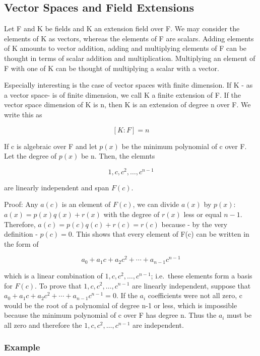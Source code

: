 \subsection{Vector Spaces and Field
Extensions}\label{vector-spaces-and-field-extensions}

Let F and K be fields and K an extension field over F. We may consider
the elements of K as vectors, whereas the elements of F are scalars.
Adding elements of K amounts to vector addition, adding and multiplying
elements of F can be thought in terms of scalar addition and
multiplication. Multiplying an element of F with one of K can be thought
of multiplying a scalar with a vector.

Especially interesting is the case of vector spaces with finite
dimension. If K - as a vector space- is of finite dimension, we call K a
finite extension of F. If the vector space dimension of K is n, then K
is an extension of degree n over F. We write this as

\[
[K:F] = n
\]

If c is algebraic over F and let \(p(x)\) be the minimum polynomial of c
over F. Let the degree of \(p(x)\) be n. Then, the elemnts

\[
1, c, c^2, \ldots, c^{n-1}
\]

are linearly independent and span \(F(c)\).

Proof: Any \(a(c)\) is an element of \(F(c)\), we can divide \(a(x)\) by
\(p(x)\): \(a(x) = p(x) q(x) + r(x)\) with the degree of \(r(x)\) less
or equal \(n-1\). Therefore, \(a(c) = p(c) q(c) + r(c) = r(c)\) because
- by the very definition - \(p(c) = 0\). This shows that every element
of F(c) can be written in the form of

\[
a_0 + a_1 c + a_2 c^2 + \cdots + a_{n-1} c^{n-1}
\]

which is a linear combination of \(1, c, c^2, \ldots, c^{n-1}\);
i.e.~these elements form a basis for \(F(c)\). To prove that
\(1, c, c^2, \ldots, c^{n-1}\) are linearly independent, suppose that
\(a_0 + a_1 c + a_2 c^2 + \cdots + a_{n-1} c^{n-1} = 0\). If the \(a_i\)
coefficients were not all zero, c would be the root of a polynomial of
degree n-1 or less, which is impossible because the minimum polynomial
of c over F has degree n. Thus the \(a_i\) must be all zero and
therefore the \(1, c, c^2, \ldots, c^{n-1}\) are independent.

\subsubsection{Example}\label{example}

